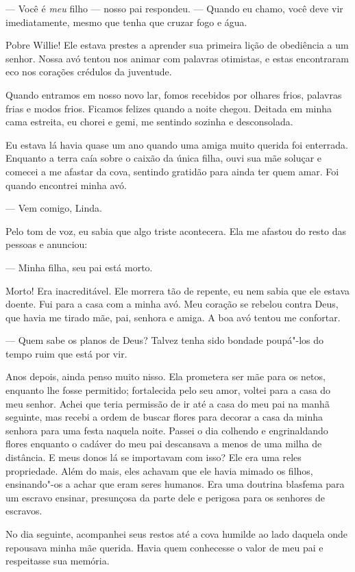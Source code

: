 --- Você é \emph{meu} filho --- nosso
pai respondeu. --- Quando eu chamo, você deve vir imediatamente, mesmo
que tenha que cruzar fogo e água.

Pobre Willie! Ele estava prestes a
aprender sua primeira lição de obediência a um senhor. Nossa avó tentou
nos animar com palavras otimistas, e estas encontraram eco nos corações
crédulos da juventude.

Quando entramos em nosso novo lar,
fomos recebidos por olhares frios, palavras frias e modos frios. Ficamos
felizes quando a noite chegou. Deitada em minha cama estreita, eu chorei
e gemi, me sentindo sozinha e desconsolada.

Eu estava lá havia quase um ano quando
uma amiga muito querida foi enterrada. Enquanto a terra caía sobre o
caixão da única filha, ouvi sua mãe soluçar e comecei a me afastar da
cova, sentindo gratidão para ainda ter quem amar. Foi quando encontrei
minha avó.

--- Vem comigo, Linda.

Pelo tom de voz, eu sabia que algo triste acontecera. Ela me afastou do
resto das pessoas e anunciou:

--- Minha filha, seu pai está morto.

Morto! Era inacreditável. Ele morrera tão de repente, eu nem sabia que
ele estava doente. Fui para a casa com a minha avó. Meu coração se
rebelou contra Deus, que havia me tirado mãe, pai, senhora e amiga. A
boa avó tentou me confortar.

--- Quem sabe os planos de Deus? Talvez tenha sido bondade poupá"-los do
tempo ruim que está por vir.

Anos depois, ainda penso muito nisso. Ela prometera ser mãe para os
netos, enquanto lhe fosse permitido; fortalecida pelo seu amor, voltei
para a casa do meu senhor. Achei que teria permissão de ir até a casa do
meu pai na manhã seguinte, mas recebi a ordem de buscar flores para
decorar a casa da minha senhora para uma festa naquela noite. Passei o
dia colhendo e engrinaldando flores enquanto o cadáver do meu pai
descansava a menos de uma milha de distância. E meus donos lá se
importavam com isso? Ele era uma reles propriedade. Além do mais, eles
achavam que ele havia mimado os filhos, ensinando"-os a achar que eram
seres humanos. Era uma doutrina blasfema para um escravo ensinar,
presunçosa da parte dele e perigosa para os senhores de escravos.

No dia seguinte, acompanhei seus restos
até a cova humilde ao lado daquela onde repousava minha mãe querida.
Havia quem conhecesse o valor de meu pai e respeitasse sua memória.

